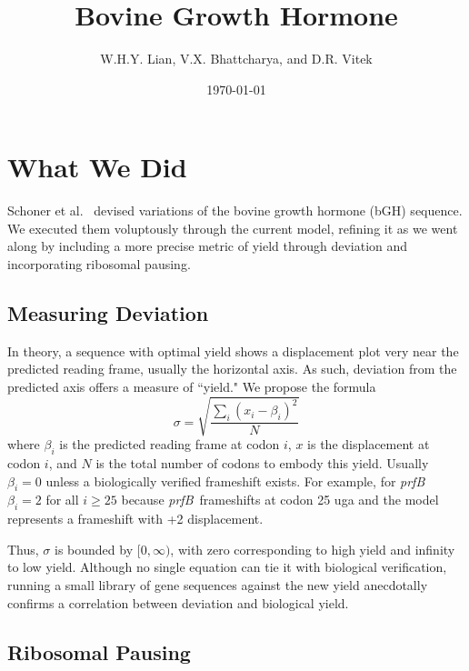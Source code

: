 \documentclass[10pt,twocolumn]{article}
\newcommand{\prfB}{\emph{prfB}}
\begin{document}
\title{{\bf Bovine Growth Hormone}}
\author{{\sc W.H.Y. Lian, V.X. Bhattcharya, and D.R. Vitek}}
\date{{\sc \today}}
\maketitle

\section{What We Did}
\label{whatwedid}

Schoner et al.~\cite{schoner:bgh} devised variations of the bovine growth hormone (bGH) sequence.
We executed them voluptously through the current model, refining it as we went along by including
a more precise metric of yield through deviation and incorporating ribosomal pausing.

\subsection{Measuring Deviation}
\label{whatwedid:lbd}

In theory, a sequence with optimal yield shows a displacement plot very near the predicted reading frame,
usually the horizontal axis. As such, deviation from the predicted axis offers a measure of ``yield."
We propose the formula
\begin{equation}
    \label{eqn:lbd}
    \sigma = \sqrt{\frac{\sum_i \left(x_i - \beta_i\right)^2}{N}}
\end{equation}
where $\beta_i$ is the predicted reading frame at codon $i$, $x$ is the displacement at codon $i$,
and $N$ is the total number of codons to embody this yield. Usually $\beta_i = 0$ unless a biologically verified frameshift exists. For example, for \prfB\ $\beta_i = 2$ for all $i \geq 25$ because \prfB\ frameshifts at codon 25 uga
and the model represents a frameshift with +2 displacement.

Thus, $\sigma$ is bounded by $[0,\infty)$, with zero corresponding to high yield and infinity to low yield.
Although no single equation can tie it with biological verification, running a small library of gene sequences
against the new yield anecdotally confirms a correlation between deviation and biological yield.

\subsection{Ribosomal Pausing}
\label{rp}
\end{document}
